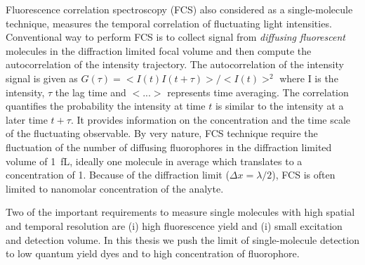 Fluorescence correlation spectroscopy (FCS) also considered as a single-molecule technique, measures the temporal correlation of fluctuating light intensities.
Conventional way to perform FCS is to collect signal from \textit{diffusing fluorescent} molecules in the diffraction limited focal volume and then compute the autocorrelation of the intensity trajectory.
The autocorrelation of the intensity signal is given as $G(\tau)=<I(t)I(t+\tau)>/<I(t)>^2$ where I is the intensity, $\tau$ the lag time and $<...>$ represents time averaging.
The correlation quantifies the probability the intensity at time $t$ is similar to the intensity at a later time $t+\tau$.
It provides information on the concentration and the time scale of the fluctuating observable.
By very nature, FCS technique require the fluctuation of the number of diffusing fluorophores in the diffraction limited volume of \SI{1}{fL}, ideally one molecule in average which translates to a concentration of \SI{1}{\nM}.
Because of the diffraction limit ($\Delta{x}={\lambda}/2$), FCS is often limited to nanomolar concentration of the analyte. 

Two of the important requirements to measure single molecules with high spatial and temporal resolution are (i) high fluorescence yield and (i) small excitation and detection volume.
In this thesis we push the limit of single-molecule detection to low quantum yield dyes and to high concentration of fluorophore.

